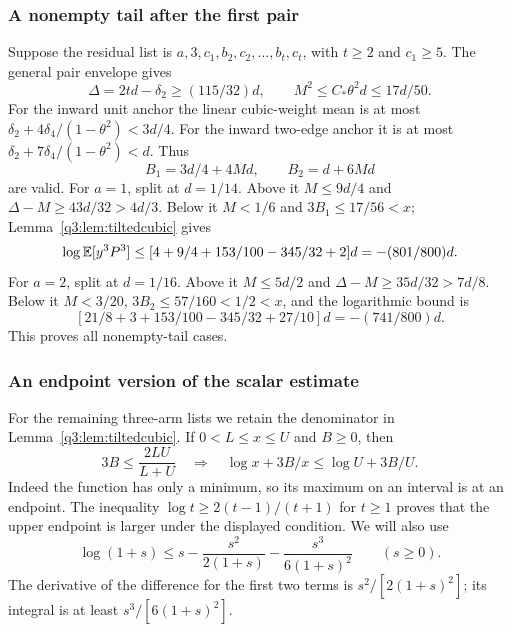 \subsubsection{A nonempty tail after the first pair}
Suppose the residual list is $a,3,c_1,b_2,c_2,\ldots,b_t,c_t$, with $t\ge2$ and $c_1\ge5$. The general pair envelope gives
\[
 \Delta=2td-\delta_{2}\ge(115/32)d,\qquad
 M^2\le C_*\theta^2d\le17d/50 .
\]
For the inward unit anchor the linear cubic-weight mean is at most
$\delta_{2}+4\delta_{4}/(1-\theta^2)<3d/4$. For the inward two-edge anchor it is at most
$\delta_{2}+7\delta_{4}/(1-\theta^2)<d$. Thus
\[
 B_1=3d/4+4Md,\qquad B_2=d+6Md
\]
are valid. For $a=1$, split at $d=1/14$. Above it $M\le9d/4$ and $\Delta-M\ge43d/32>4d/3$. Below it $M<1/6$ and $3B_1\le17/56<x$; Lemma~\ref{q3:lem:tiltedcubic} gives
\[
 \log\mathbb E[y^3P^3]\le
 [4+9/4+153/100-345/32+2]d=-(801/800)d.
\]
For $a=2$, split at $d=1/16$. Above it $M\le5d/2$ and $\Delta-M\ge35d/32>7d/8$. Below it $M<3/20$, $3B_2\le57/160<1/2<x$, and the logarithmic bound is
\[
 [21/8+3+153/100-345/32+27/10]d=-(741/800)d.
\]
This proves all nonempty-tail cases.

\subsubsection{An endpoint version of the scalar estimate}
For the remaining three-arm lists we retain the denominator in Lemma~\ref{q3:lem:tiltedcubic}. If $0<L\le x\le U$ and $B\ge0$, then
\begin{equation}\label{q3:eq:endpointscalar}
 3B\le\frac{2LU}{L+U}
 \quad\Longrightarrow\quad
 \log x+3B/x\le\log U+3B/U.
\end{equation}
Indeed the function has only a minimum, so its maximum on an interval is at an endpoint. The inequality
$\log t\ge2(t-1)/(t+1)$ for $t\ge1$ proves that the upper endpoint is larger under the displayed condition. We will also use
\begin{equation}\label{q3:eq:thirdlog}
 \log(1+s)\le s-\frac{s^2}{2(1+s)}-\frac{s^3}{6(1+s)^2}
 \qquad(s\ge0).
\end{equation}
The derivative of the difference for the first two terms is $s^2/[2(1+s)^2]$; its integral is at least $s^3/[6(1+s)^2]$.

